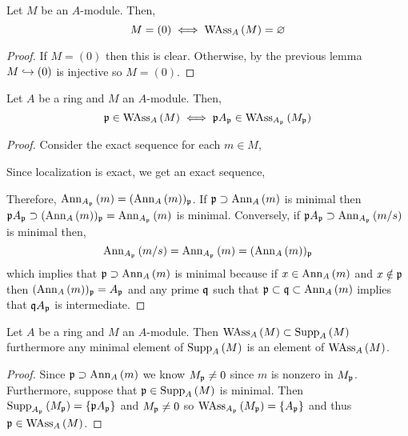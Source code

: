 \documentclass[12pt]{article}
\begin{document}
\begin{lemma}
Let $M$ be an $A$-module. Then,
\[ M = (0) \iff \WAss{A}{M} = \empty \]
\end{lemma}

\begin{proof}
If $M = (0)$ then this is clear. Otherwise, by the previous lemma $M \embed (0)$ is injective so $M = (0)$. 
\end{proof}

\begin{lemma} \label{weak_ass_primes_localization}
Let $A$ be a ring and $M$ an $A$-module. Then,
\[ \p \in \WAss{A}{M} \iff \p A_\p \in \WAss{A_\p}{M_\p} \]
\end{lemma}

\begin{proof}
Consider the exact sequence for each $m \in M$,
\begin{center}
\end{center}
Since localization is exact, we get an exact sequence,
\begin{center}
\end{center}
Therefore, $\Ann{A_\p}{m} = (\Ann{A}{m})_\p$. If $\p \supset \Ann{A}{m}$ is minimal then $\p A_\p \supset (\Ann{A}{m})_\p = \Ann{A_\p}{m}$ is minimal. Conversely, if $\p A_\p \supset \Ann{A_\p}{m/s}$ is minimal then,
\[ \Ann{A_\p}{m/s} = \Ann{A_\p}{m} = (\Ann{A}{m})_\p \]
which implies that $\p \supset \Ann{A}{m}$ is minimal because if $x \in \Ann{A}{m}$ and $x \notin \p$ then $(\Ann{A}{m})_\p = A_\p$ and any prime $\q$ such that $\p \subset \q \subset \Ann{A}{m}$ implies that $\q A_\p$ is intermediate.
\end{proof}

\begin{lemma} \label{minimal_supp_wass}
Let $A$ be a ring and $M$ an $A$-module. Then $\WAss{A}{M} \subset \Supp{A}{M}$ furthermore any minimal element of $\Supp{A}{M}$ is an element of $\WAss{A}{M}$.
\end{lemma}

\begin{proof}
Since $\p \supset \Ann{A}{m}$ we know $M_\p \neq 0$ since $m$ is nonzero in $M_\p$. Furthermore, suppose that $\p \in \Supp{A}{M}$ is minimal. Then $\Supp{A_\p}{M_\p} = \{ \p A_\p \}$ and $M_\p \neq 0$ so $\WAss{A_\p}{M_\p} = \{ A_\p \}$ and thus $\p \in \WAss{A}{M}$.
\end{proof}
\end{document}
